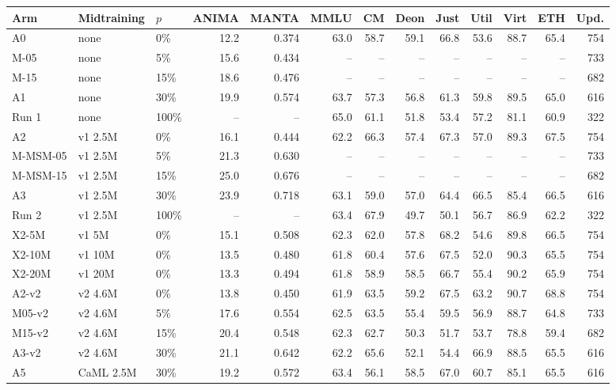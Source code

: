 \begin{tabular}{lllrrrrrrrrrr}
\toprule
Arm & Midtraining & $p$ & ANIMA & MANTA & MMLU & CM & Deon & Just & Util & Virt & ETH & Upd. \\
\midrule
A0 & none & 0\% & 12.2 & 0.374 & 63.0 & 58.7 & 59.1 & 66.8 & 53.6 & 88.7 & 65.4 & 754 \\
M-05 & none & 5\% & 15.6 & 0.434 & -- & -- & -- & -- & -- & -- & -- & 733 \\
M-15 & none & 15\% & 18.6 & 0.476 & -- & -- & -- & -- & -- & -- & -- & 682 \\
A1 & none & 30\% & 19.9 & 0.574 & 63.7 & 57.3 & 56.8 & 61.3 & 59.8 & 89.5 & 65.0 & 616 \\
Run 1 & none & 100\% & -- & -- & 65.0 & 61.1 & 51.8 & 53.4 & 57.2 & 81.1 & 60.9 & 322 \\
A2 & v1 2.5M & 0\% & 16.1 & 0.444 & 62.2 & 66.3 & 57.4 & 67.3 & 57.0 & 89.3 & 67.5 & 754 \\
M-MSM-05 & v1 2.5M & 5\% & 21.3 & 0.630 & -- & -- & -- & -- & -- & -- & -- & 733 \\
M-MSM-15 & v1 2.5M & 15\% & 25.0 & 0.676 & -- & -- & -- & -- & -- & -- & -- & 682 \\
A3 & v1 2.5M & 30\% & 23.9 & 0.718 & 63.1 & 59.0 & 57.0 & 64.4 & 66.5 & 85.4 & 66.5 & 616 \\
Run 2 & v1 2.5M & 100\% & -- & -- & 63.4 & 67.9 & 49.7 & 50.1 & 56.7 & 86.9 & 62.2 & 322 \\
X2-5M & v1 5M & 0\% & 15.1 & 0.508 & 62.3 & 62.0 & 57.8 & 68.2 & 54.6 & 89.8 & 66.5 & 754 \\
X2-10M & v1 10M & 0\% & 13.5 & 0.480 & 61.8 & 60.4 & 57.6 & 67.5 & 52.0 & 90.3 & 65.5 & 754 \\
X2-20M & v1 20M & 0\% & 13.3 & 0.494 & 61.8 & 58.9 & 58.5 & 66.7 & 55.4 & 90.2 & 65.9 & 754 \\
A2-v2 & v2 4.6M & 0\% & 13.8 & 0.450 & 61.9 & 63.5 & 59.2 & 67.5 & 63.2 & 90.7 & 68.8 & 754 \\
M05-v2 & v2 4.6M & 5\% & 17.6 & 0.554 & 62.5 & 63.5 & 55.4 & 59.5 & 56.9 & 88.7 & 64.8 & 733 \\
M15-v2 & v2 4.6M & 15\% & 20.4 & 0.548 & 62.3 & 62.7 & 50.3 & 51.7 & 53.7 & 78.8 & 59.4 & 682 \\
A3-v2 & v2 4.6M & 30\% & 21.1 & 0.642 & 62.2 & 65.6 & 52.1 & 54.4 & 66.9 & 88.5 & 65.5 & 616 \\
A5 & CaML 2.5M & 30\% & 19.2 & 0.572 & 63.4 & 56.1 & 58.5 & 67.0 & 60.7 & 85.1 & 65.5 & 616 \\
\bottomrule
\end{tabular}
